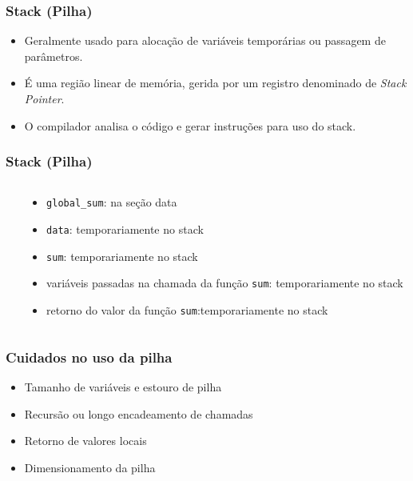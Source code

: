\documentclass{beamer}
\begin{document}
\begin{frame}
	\frametitle{Stack (Pilha)}
	\begin{itemize}
		\item Geralmente usado para alocação de variáveis temporárias ou passagem de parâmetros.
		\item É uma região linear de memória, gerida por um registro denominado de \textit{Stack Pointer}.
		\item O compilador analisa o código e gerar instruções para uso do stack.
	\end{itemize}
\end{frame}

\begin{frame}
	\frametitle{Stack (Pilha)}
	\begin{columns}[T] %
	\begin{column}{.60\textwidth}
		
	\end{column}%
	\hfill%
    \pause
	\begin{column}{.40\textwidth}
    {\footnotesize
	\begin{itemize}
	\item \texttt{global\_sum}: na seção data
    \item \texttt{data}: temporariamente no stack
    \item \texttt{sum}: temporariamente no stack
    \item variáveis passadas na chamada da função \texttt{sum}: temporariamente no stack
    \item retorno do valor da função \texttt{sum}:temporariamente  no stack
	\end{itemize}
    }
	\end{column}%
\end{columns}
\end{frame}

\begin{frame}
	\frametitle{Cuidados no uso da pilha}
	\begin{itemize}
	\item Tamanho de variáveis e estouro de pilha
	\item Recursão ou longo encadeamento de chamadas
	\item Retorno de valores locais
	\item Dimensionamento da pilha
	\end{itemize}
\end{frame}
\end{document}
